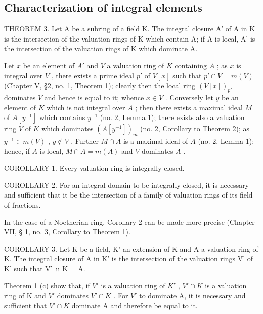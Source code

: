 \subsection{Characterization of integral elements}

THEOREM 3. Let A be a subring of a field K. The integral closure A' of A in K is the intersection of the valuation rings of K which contain A; if A is local, A' is the intersection of the valuation rings of K which dominate A.

Let \(x\) be an element of \(A'\) and \(V\) a valuation ring of \(K\) containing \(A\) ; as \(x\) is integral over \(V\) , there exists a prime ideal \(p'\) of \(V[x]\) such that \(p' \cap V = m(V)\) (Chapter V, §2, no. 1, Theorem 1); clearly then the local ring \((V[x])_{p'}\) dominates \(V\) and hence is equal to it; whence \(x \in V\) . Conversely let \(y\) be an element of \(K\) which is not integral over \(A\) ; then there exists a maximal ideal \(M\) of \(A[y^{-1}]\) which contains \(y^{-1}\) (no. 2, Lemma 1); there exists also a valuation ring \(V\) of \(K\) which dominates \((A[y^{-1}])_{m}\) (no. 2, Corollary to Theorem 2); as \(y^{-1} \in m(V)\) , \(y \notin V\) . Further \(M \cap A\) is a maximal ideal of \(A\) (no. 2, Lemma 1); hence, if \(A\) is local, \(M \cap A = m(A)\) and \(V\) dominates \(A\) .

COROLLARY 1. Every valuation ring is integrally closed.

COROLLARY 2. For an integral domain to be integrally closed, it is necessary and sufficient that it be the intersection of a family of valuation rings of its field of fractions.

In the case of a Noetherian ring, Corollary 2 can be made more precise (Chapter VII, § 1, no. 3, Corollary to Theorem 1).

COROLLARY 3. Let K be a field, K' an extension of K and A a valuation ring of K. The integral closure of A in K' is the intersection of the valuation rings V' of K' such that V' ∩ K = A.

Theorem 1 (c) show that, if \(V'\) is a valuation ring of \(K'\) , \(V' \cap K\) is a valuation ring of K and \(V'\) dominates \(V' \cap K\) . For \(V'\) to dominate A, it is necessary and sufficient that \(V' \cap K\) dominate A and therefore be equal to it.

